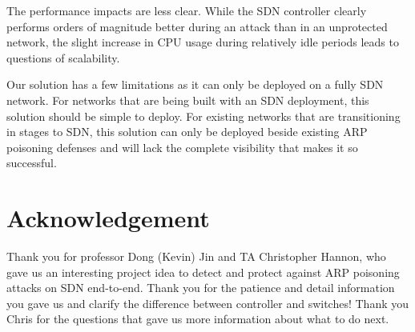 \documentclass[conference]{IEEEtran}
\begin{document}
The performance impacts are less clear. While the SDN controller clearly performs orders of magnitude better during an attack than in an unprotected network, the slight increase in CPU usage during relatively idle periods leads to questions of scalability.

Our solution has a few limitations as it can only be deployed on a fully SDN network. For networks that are being built with an SDN deployment, this solution should be simple to deploy. For existing networks that are transitioning in stages to SDN, this solution can only be deployed beside existing ARP poisoning defenses and will lack the complete visibility that makes it so successful.

\section*{Acknowledgement}
Thank you for professor Dong (Kevin) Jin and TA Christopher Hannon, who gave us an interesting project idea to detect and protect against ARP poisoning attacks on SDN end-to-end. Thank you for the patience and detail information you gave us and clarify the difference between controller and switches!
Thank you Chris for the questions that gave us more information about what to do next.
\end{document}
